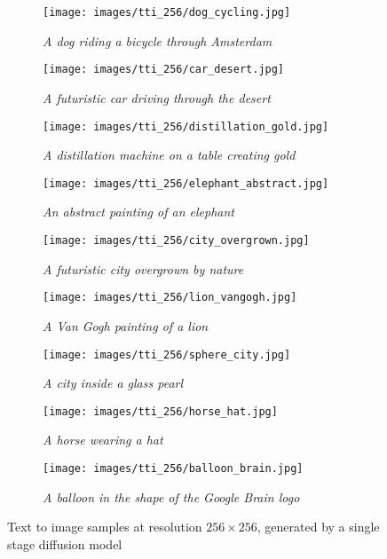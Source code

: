 \begin{figure*}
\centering
\begin{subfigure}[t]{0.33\textwidth}
\centering
\texttt{[image: images/tti\_256/dog\_cycling.jpg]}
\caption{\textit{A dog riding a bicycle through Amsterdam}}
\end{subfigure} \hfill
\begin{subfigure}[t]{0.33\textwidth}
\centering
\texttt{[image: images/tti\_256/car\_desert.jpg]}
\caption{\textit{A futuristic car driving through the desert}}
 \end{subfigure} \hfill
\begin{subfigure}[t]{0.33\textwidth}
\centering
\texttt{[image: images/tti\_256/distillation\_gold.jpg]}
\caption{\textit{A distillation machine on a table creating gold}}
\end{subfigure} \hfill
\begin{subfigure}[t]{0.33\textwidth}
\texttt{[image: images/tti\_256/elephant\_abstract.jpg]}
\caption{\textit{An abstract painting of an elephant}}
\end{subfigure} \hfill
\begin{subfigure}[t]{0.33\textwidth}
\centering
\texttt{[image: images/tti\_256/city\_overgrown.jpg]}
\caption{\textit{A futuristic city overgrown by nature}}
\end{subfigure} \hfill
\begin{subfigure}[t]{0.33\textwidth}
\centering
\texttt{[image: images/tti\_256/lion\_vangogh.jpg]}
\caption{\textit{A Van Gogh painting of a lion}}
\end{subfigure}
\begin{subfigure}[t]{0.33\textwidth}
\centering
\texttt{[image: images/tti\_256/sphere\_city.jpg]}
\caption{\textit{A city inside a glass pearl}}
\end{subfigure} \hfill
\begin{subfigure}[t]{0.33\textwidth}
\centering
\texttt{[image: images/tti\_256/horse\_hat.jpg]}
\caption{\textit{A horse wearing a hat}}
\end{subfigure} \hfill
\begin{subfigure}[t]{0.33\textwidth}
\centering
\texttt{[image: images/tti\_256/balloon\_brain.jpg]}
\caption{\textit{A balloon in the shape of the Google Brain logo}}
\end{subfigure}
\caption{Text to image samples at resolution $256 \times 256$, generated by a single stage diffusion model}
\end{figure*}

